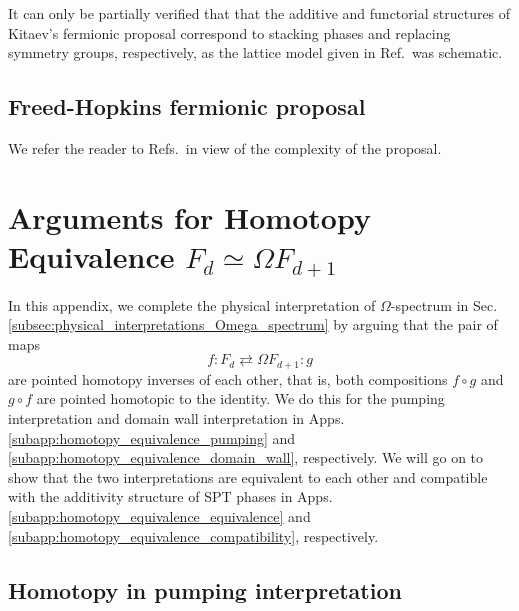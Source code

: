 \documentclass[sort&compress]{elsarticle}
\theoremstyle{theoremstyle}
\theoremstyle{framedtheoremstyle}
\theoremstyle{definitionstyle}
\theoremstyle{definitionstyle}
\theoremstyle{definitionstyle}
\theoremstyle{definitionstyle}
\theoremstyle{nameddefinitionstyle}
\theoremstyle{framednameddefinitionstyle}
\theoremstyle{proofstyle}
\theoremstyle{definitionstyle}
\newcommand{\homotopic}{\simeq}
\begin{document}
\begin{appendices}
It can only be partially verified that that the additive and functorial structures of Kitaev's fermionic proposal correspond to stacking phases and replacing symmetry groups, respectively, as the lattice model given in Ref.\,\cite{Kitaev_KITP} was schematic.





\subsection{Freed-Hopkins fermionic proposal \label{subapp:Freed_fermionic_proposal}}

We refer the reader to Refs.\,\cite{Freed_SRE_iTQFT, Freed_ReflectionPositivity} in view of the complexity of the proposal.










\section{Arguments for Homotopy Equivalence $F_d \homotopic \Omega F_{d+1}$\label{app:homotopy_equivalence}}

In this appendix, we complete the physical interpretation of $\Omega$-spectrum in Sec.\,\ref{subsec:physical_interpretations_Omega_spectrum} by arguing that the pair of maps
\begin{equation}
f: F_d \rightleftarrows \Omega F_{d+1} : g
\end{equation}
are pointed homotopy inverses of each other, that is, both compositions $f \circ g$ and $g \circ f$ are pointed homotopic to the identity. We do this for the pumping interpretation and domain wall interpretation in Apps.\,\ref{subapp:homotopy_equivalence_pumping} and \ref{subapp:homotopy_equivalence_domain_wall}, respectively. We will go on to show that the two interpretations are equivalent to each other and compatible with the additivity structure of SPT phases in Apps.\,\ref{subapp:homotopy_equivalence_equivalence} and \ref{subapp:homotopy_equivalence_compatibility}, respectively.

\subsection{Homotopy in pumping interpretation\label{subapp:homotopy_equivalence_pumping}}


\end{appendices}
\end{document}
